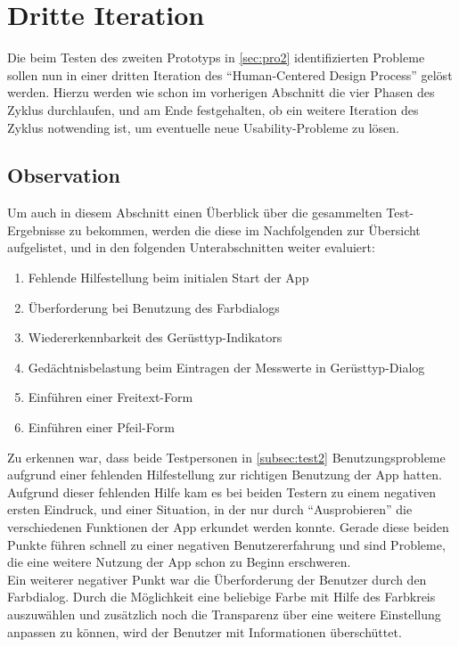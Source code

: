 \section{Dritte Iteration}
Die beim Testen des zweiten Prototyps in \autoref{sec:pro2} identifizierten Probleme sollen nun in einer dritten Iteration des ``Human-Centered Design Process'' gelöst werden.
Hierzu werden wie schon im vorherigen Abschnitt die vier Phasen des Zyklus durchlaufen, und am Ende festgehalten, ob ein weitere Iteration des Zyklus notwending ist, um eventuelle neue Usability-Probleme zu lösen.

\subsection{Observation}\label{subsec:obs3}

Um auch in diesem Abschnitt einen Überblick über die gesammelten Test-Ergebnisse zu bekommen, werden die diese im Nachfolgenden zur Übersicht aufgelistet, und in den folgenden Unterabschnitten weiter evaluiert:

\begin{enumerate}
  \item Fehlende Hilfestellung beim initialen Start der App
  \item Überforderung bei Benutzung des Farbdialogs
  \item Wiedererkennbarkeit des Gerüsttyp-Indikators
  \item Gedächtnisbelastung beim Eintragen der Messwerte in Gerüsttyp-Dialog
  \item Einführen einer Freitext-Form
  \item Einführen einer Pfeil-Form 
\end{enumerate}

Zu erkennen war, dass beide Testpersonen in \autoref{subsec:test2} Benutzungsprobleme aufgrund einer fehlenden Hilfestellung zur richtigen Benutzung der App hatten.
Aufgrund dieser fehlenden Hilfe kam es bei beiden Testern zu einem negativen ersten Eindruck, und einer Situation, in der nur durch ``Ausprobieren'' die verschiedenen Funktionen der App erkundet werden konnte.
Gerade diese beiden Punkte führen schnell zu einer negativen Benutzererfahrung und sind Probleme, die eine weitere Nutzung der App schon zu Beginn erschweren. \\

Ein weiterer negativer Punkt war die Überforderung der Benutzer durch den Farbdialog.
Durch die Möglichkeit eine beliebige Farbe mit Hilfe des Farbkreis auszuwählen und zusätzlich noch die Transparenz über eine weitere Einstellung anpassen zu können, wird der Benutzer mit Informationen überschüttet. \\

